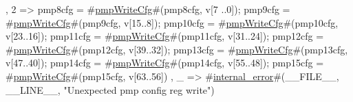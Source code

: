{{{              },
         2 => { pmp8cfg  = #\hyperref[sailRISCVzpmpWriteCfg]{pmpWriteCfg}#(pmp8cfg,  v[7 ..0]);
                pmp9cfg  = #\hyperref[sailRISCVzpmpWriteCfg]{pmpWriteCfg}#(pmp9cfg,  v[15..8]);
                pmp10cfg = #\hyperref[sailRISCVzpmpWriteCfg]{pmpWriteCfg}#(pmp10cfg, v[23..16]);
                pmp11cfg = #\hyperref[sailRISCVzpmpWriteCfg]{pmpWriteCfg}#(pmp11cfg, v[31..24]);
                pmp12cfg = #\hyperref[sailRISCVzpmpWriteCfg]{pmpWriteCfg}#(pmp12cfg, v[39..32]);
                pmp13cfg = #\hyperref[sailRISCVzpmpWriteCfg]{pmpWriteCfg}#(pmp13cfg, v[47..40]);
                pmp14cfg = #\hyperref[sailRISCVzpmpWriteCfg]{pmpWriteCfg}#(pmp14cfg, v[55..48]);
                pmp15cfg = #\hyperref[sailRISCVzpmpWriteCfg]{pmpWriteCfg}#(pmp15cfg, v[63..56])
              },
         _ => #\hyperref[sailRISCVzinternalzyerror]{internal\_error}#(__FILE__, __LINE__, "Unexpected pmp config reg write")
       }
}

